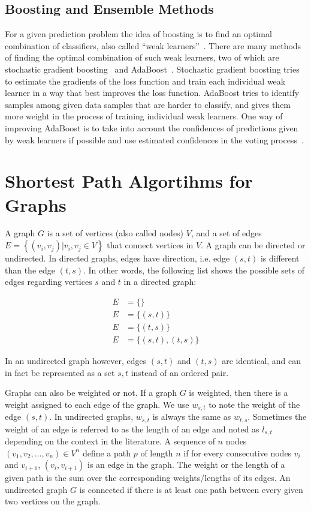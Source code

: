 \subsection{Boosting and Ensemble Methods}
For a given prediction problem the idea of boosting is to find an optimal combination of classifiers, also called ``weak learners''~\cite{ensemble2002}. There are many methods of finding the optimal combination of such weak learners, two of which are stochastic gradient boosting~\cite{friedman2002stochastic} and AdaBoost~\cite{adaboost97}. Stochastic gradient boosting tries to estimate the gradients of the loss function and train each individual weak learner in a way that best improves the loss function. AdaBoost tries to identify samples among given data samples that are harder to classify, and gives them more weight in the process of training individual weak learners. One way of improving AdaBoost is to take into account the confidences of predictions given by weak learners if possible and use estimated confidences in the voting process~\cite{adaboost99improved}.

\section{Shortest Path Algortihms for Graphs}
A graph $G$ is a set of vertices (also called nodes) $V$, and a set of edges $E=\left\{(v_i, v_j) | v_i, v_j \in V\right\}$ that connect vertices in $V$. A graph can be directed or undirected. In directed graphs, edges have direction, i.e. edge $(s, t)$ is different than the edge $(t, s)$. In other words, the following list shows the possible sets of edges regarding vertices $s$ and $t$ in a directed graph:

\begin{align}
  E &= \{\} \nonumber \\
  E &= \{(s, t)\} \nonumber \\
  E &= \{(t, s)\} \nonumber \\
  E &= \{(s, t), (t, s)\}
\end{align}

In an undirected graph however, edges $(s, t)$ and $(t, s)$ are identical, and can in fact be represented as a set ${s, t}$ instead of an ordered pair.

Graphs can also be weighted or not. If a graph $G$ is weighted, then there is a weight assigned to each edge of the graph. We use $w_{s,t}$ to note the weight of the edge $(s,t)$. In undirected graphs, $w_{s, t}$ is always the same as $w_{t, s}$. Sometimes the weight of an edge is referred to as the length of an edge and noted as $l_{s,t}$ depending on the context in the literature. A sequence of $n$ nodes $(v_1, v_2,\ldots,v_n) \in V^n$ define a path $p$ of length $n$ if for every consecutive nodes $v_i$ and $v_{i+1}$, $(v_i, v_{i+1})$ is an edge in the graph. The weight or the length of a given path is the sum over the corresponding weights/lengths of its edges.
An undirected graph $G$ is connected if there is at least one path between every given two vertices on the graph.

